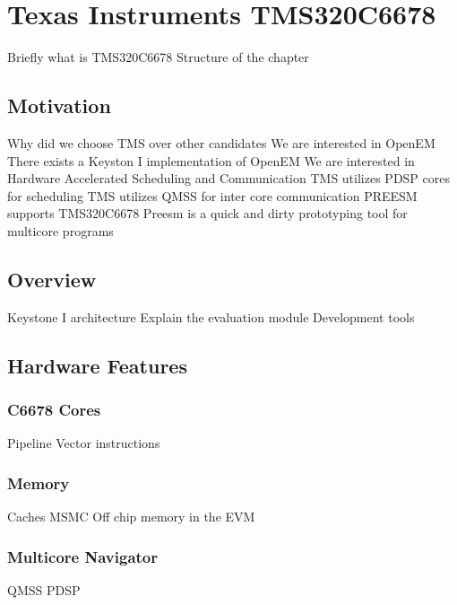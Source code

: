 \chapter{Texas Instruments TMS320C6678}
\label{chapter:c6678}
Briefly what is TMS320C6678
Structure of the chapter
\section{Motivation}
Why did we choose TMS over other candidates
    We are interested in OpenEM
        There exists a Keyston I implementation of OpenEM
    We are interested in Hardware Accelerated Scheduling and Communication
        TMS utilizes PDSP cores for scheduling
        TMS utilizes QMSS for inter core communication
    PREESM supports TMS320C6678
        Preesm is a quick and dirty prototyping tool for multicore programs
\section{Overview}
Keystone I architecture
Explain the evaluation module
Development tools

\section{Hardware Features}
\subsection{C6678 Cores}
Pipeline
Vector instructions
\subsection{Memory}
Caches
MSMC
Off chip memory in the EVM
\subsection{Multicore Navigator}
QMSS
PDSP


